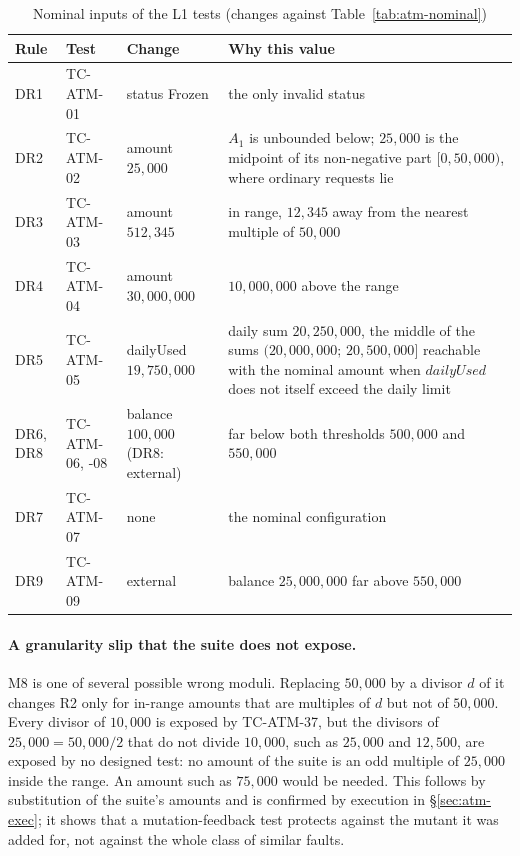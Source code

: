 \documentclass[11pt,a4paper]{article}
\begin{document}
\begin{table}[H]
\centering
\caption{Nominal inputs of the L1 tests (changes against Table~\ref{tab:atm-nominal})}
\label{tab:atm-l1}
\small
\begin{tabularx}{\textwidth}{l l l Y}
\toprule
Rule & Test & Change & Why this value \\
\midrule
DR1 & TC-ATM-01 & status Frozen & the only invalid status \\
DR2 & TC-ATM-02 & amount \(25{,}000\) & \(A_1\) is unbounded below; \(25{,}000\) is the midpoint of its non-negative part \([0,50{,}000)\), where ordinary requests lie \\
DR3 & TC-ATM-03 & amount \(512{,}345\) & in range, \(12{,}345\) away from the nearest multiple of \(50{,}000\) \\
DR4 & TC-ATM-04 & amount \(30{,}000{,}000\) & \(10{,}000{,}000\) above the range \\
DR5 & TC-ATM-05 & dailyUsed \(19{,}750{,}000\) & daily sum \(20{,}250{,}000\), the middle of the sums \((20{,}000{,}000;\,20{,}500{,}000]\) reachable with the nominal amount when \(\mathit{dailyUsed}\) does not itself exceed the daily limit \\
DR6, DR8 & TC-ATM-06, -08 & balance \(100{,}000\) (DR8: external) & far below both thresholds \(500{,}000\) and \(550{,}000\) \\
DR7 & TC-ATM-07 & none & the nominal configuration \\
DR9 & TC-ATM-09 & external & balance \(25{,}000{,}000\) far above \(550{,}000\) \\
\bottomrule
\end{tabularx}
\end{table}

\paragraph{A granularity slip that the suite does not expose.} M8 is one of
several possible wrong moduli. Replacing \(50{,}000\) by a divisor \(d\) of
it changes R2 only for in-range amounts that are multiples of \(d\) but not
of \(50{,}000\). Every divisor of \(10{,}000\) is exposed by TC-ATM-37, but
the divisors of \(25{,}000=50{,}000/2\) that do not divide \(10{,}000\), such
as \(25{,}000\) and \(12{,}500\), are exposed by no designed test: no amount
of the suite is an odd multiple of \(25{,}000\) inside the range. An amount
such as \(75{,}000\) would be needed. This follows by substitution of the
suite's amounts and is confirmed by execution in \S\ref{sec:atm-exec}; it shows that a mutation-feedback
test protects against the mutant it was added for, not against the whole
class of similar faults.
\end{document}
